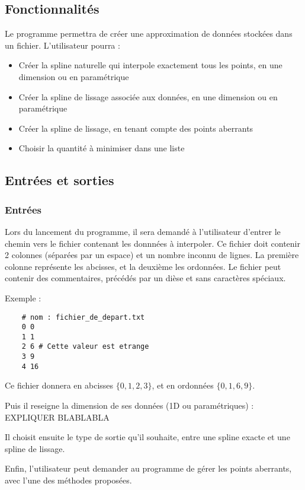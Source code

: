 \documentclass[a4paper,12pt]{article}
\begin{document}
\subsection{Fonctionnalités}
\label{Fonctions}

Le programme permettra de créer une approximation de données stockées dans un fichier. L'utilisateur pourra :
\begin{itemize}
\item Créer la spline naturelle qui interpole exactement tous les points, en une dimension ou en paramétrique
\item Créer la spline de lissage associée aux données, en une dimension ou en paramétrique
\item Créer la spline de lissage, en tenant compte des points aberrants
\item Choisir la quantité à minimiser dans une liste
\end{itemize}

\subsection{Entrées et sorties}

\subsubsection{Entrées}

Lors du lancement du programme, il sera demandé à l'utilisateur d'entrer le chemin vers le fichier contenant les donnnées à interpoler.
Ce fichier doit contenir 2 colonnes (séparées par un espace) et un nombre inconnu de lignes. La première colonne représente les abcisses, et la deuxième les ordonnées. Le fichier peut contenir des commentaires, précédés par un dièse et sans caractères spéciaux.

Exemple :

\begin{lstlisting}
    # nom : fichier_de_depart.txt
    0 0
    1 1
    2 6 # Cette valeur est etrange
    3 9
    4 16
\end{lstlisting}

Ce fichier donnera en abcisses  $\{0,1,2,3\}$, et en ordonnées $\{0,1,6,9\}$.

Puis il reseigne la dimension de ses données (1D ou paramétriques) : EXPLIQUER BLABLABLA

Il choisit ensuite le type de sortie qu'il souhaite, entre une spline exacte et une spline de lissage.

Enfin, l'utilisateur peut demander au programme de gérer les points aberrants, avec l'une des méthodes proposées.
\end{document}
